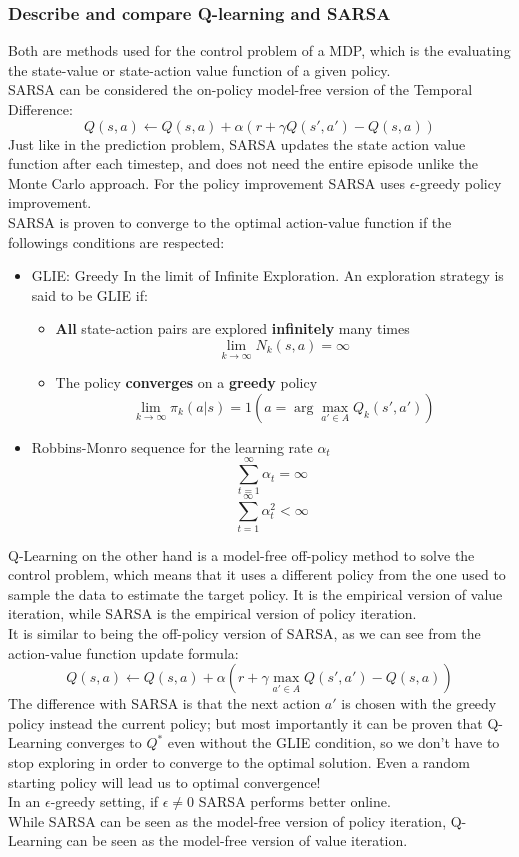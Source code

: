 \subsubsection{Describe and compare Q-learning and SARSA}
    Both are methods used for the control problem of a MDP, which is the evaluating the state-value or state-action value function of a given policy.\\
    SARSA can be considered the on-policy model-free version of the Temporal Difference:
    $$
    Q(s, a) \leftarrow Q(s, a) + \alpha(r + \gamma Q(s', a') - Q(s, a))
    $$
    Just like in the prediction problem, SARSA updates the state action value function after each timestep, and does not need the entire episode unlike the Monte Carlo approach. For the policy improvement SARSA uses $\epsilon$-greedy policy improvement.\\
    SARSA is proven to converge to the optimal action-value function if the followings conditions are respected:
    \begin{itemize}
        \item GLIE: Greedy In the limit of Infinite Exploration. An exploration strategy is said to be GLIE if:
        \begin{itemize}
            \item \textbf{All} state-action pairs are explored \textbf{infinitely} many times
            $$\lim_{k\rightarrow\infty}N_k(s,a)=\infty$$
            \item The policy \textbf{converges} on a \textbf{greedy} policy
            $$\lim_{k\rightarrow\infty}\pi_k(a|s)=1(a=\arg\max_{a'\in A}Q_k(s',a'))$$
        \end{itemize}
        \item Robbins-Monro sequence for the learning rate $\alpha_t$
        $$\sum_{t=1}^\infty\alpha_t=\infty$$
        $$\sum_{t=1}^\infty\alpha^2_t<\infty$$
    \end{itemize}
    Q-Learning on the other hand is a model-free off-policy method to solve the control problem, which means that it uses a different policy from the one used to sample the data to estimate the target policy. It is the empirical version of value iteration, while SARSA is the empirical version of policy iteration.\\
    It is similar to being the off-policy version of SARSA, as we can see from the action-value function update formula:
    $$
    Q(s,a) \leftarrow Q(s,a) + \alpha(r + \gamma\max_{a' \in A}Q(s', a') - Q(s, a))
    $$
    The difference with SARSA is that the next action $a'$ is chosen with the greedy policy instead the current policy; but most importantly it can be proven that Q-Learning converges to $Q^*$ even without the GLIE condition, so we don't have to stop exploring in order to converge to the optimal solution. Even a random starting policy will lead us to optimal convergence!\\
    In an $\epsilon$-greedy setting, if $\epsilon\neq 0$ SARSA performs better online.\\
    While SARSA can be seen as the model-free version of policy iteration, Q-Learning can be seen as the model-free version of value iteration. 

